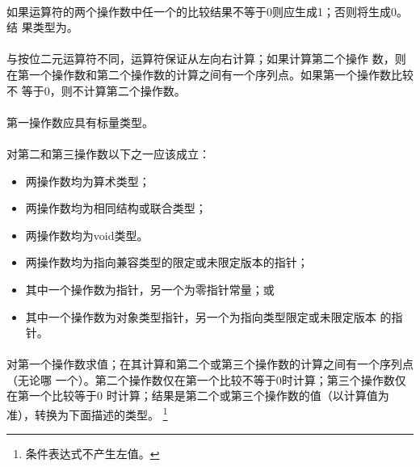 \semantic
\paragraph{}
如果\tm{||}运算符的两个操作数中任一个的比较结果不等于0则应生成1；否则将生成0。结
果类型为。

\paragraph{}
与按位二元\tm{|}运算符不同，\tm{||}运算符保证从左向右计算；如果计算第二个操作
数，则在第一个操作数和第二个操作数的计算之间有一个序列点。如果第一个操作数比较不
等于0，则不计算第二个操作数。

\syntax
\paragraph{}

\constraint
\paragraph{}
第一操作数应具有标量类型。

\paragraph{}
对第二和第三操作数以下之一应该成立：
\begin{itemize}
  \item{两操作数均为算术类型；}
  \item{两操作数均为相同结构或联合类型；}
  \item{两操作数均为void类型。}
  \item{两操作数均为指向兼容类型的限定或未限定版本的指针；}
  \item{其中一个操作数为指针，另一个为零指针常量；或}
  \item{其中一个操作数为对象类型指针，另一个为指向类型限定或未限定版本
    的指针。}
\end{itemize}

\semantic
\paragraph{}
对第一个操作数求值；在其计算和第二个或第三个操作数的计算之间有一个序列点（无论哪
一个）。第二个操作数仅在第一个比较不等于0时计算；第三个操作数仅在第一个比较等于0
时计算；结果是第二个或第三个操作数的值（以计算值为准），转换为下面描述的类型。
\footnote{条件表达式不产生左值。}

